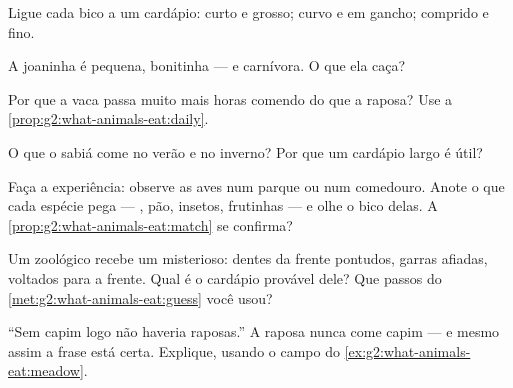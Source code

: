 \begin{exercise}[$\star$]\label{exo:g2:what-animals-eat:4}
Ligue cada bico a um cardápio: curto e grosso; curvo e em gancho;
comprido e fino.
\end{exercise}

\begin{exercise}[$\star$]\label{exo:g2:what-animals-eat:5}
A joaninha é pequena, bonitinha --- e carnívora. O que ela caça?
\end{exercise}

\begin{exercise}[$\star$]\label{exo:g2:what-animals-eat:6}
Por que a vaca passa muito mais horas comendo do que a raposa? Use a
\cref{prop:g2:what-animals-eat:daily}.
\end{exercise}

\begin{exercise}[$\star$]\label{exo:g2:what-animals-eat:7}
O que o sabiá come no verão e no inverno? Por que um cardápio largo
é útil?
\end{exercise}

\begin{exercise}[$\star$]\label{exo:g2:what-animals-eat:8}
Faça a experiência: observe as aves num parque ou num comedouro.
Anote o que cada espécie pega --- , pão, insetos, frutinhas
--- e olhe o bico delas. A \cref{prop:g2:what-animals-eat:match} se
confirma?
\end{exercise}

\begin{exercise}[$\star\star$]\label{exo:g2:what-animals-eat:9}
Um zoológico recebe um  misterioso: dentes da frente pontudos,
garras afiadas,  voltados para a frente. Qual é o cardápio
provável dele? Que passos do \cref{met:g2:what-animals-eat:guess}
você usou?
\end{exercise}

\begin{exercise}[$\star\star$]\label{exo:g2:what-animals-eat:10}
``Sem capim logo não haveria raposas.'' A raposa nunca come capim
--- e mesmo assim a frase está certa. Explique, usando o campo do
\cref{ex:g2:what-animals-eat:meadow}.
\end{exercise}
